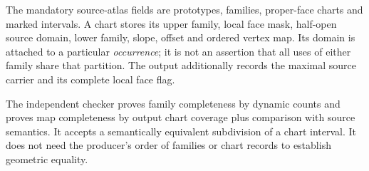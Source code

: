 \documentclass[11pt]{article}
\theoremstyle{definition}\newtheorem{definition}[theorem]{Definition}
\theoremstyle{remark}\newtheorem{remark}[theorem]{Remark}
\begin{document}
The mandatory source-atlas fields are prototypes, families, proper-face charts and marked intervals. A chart stores its upper family, local face mask, half-open source domain, lower family, slope, offset and ordered vertex map. Its domain is attached to a particular \emph{occurrence}; it is not an assertion that all uses of either family share that partition. The output additionally records the maximal source carrier and its complete local face flag.

The independent checker proves family completeness by dynamic counts and proves map completeness by output chart coverage plus comparison with source semantics. It accepts a semantically equivalent subdivision of a chart interval. It does not need the producer's order of families or chart records to establish geometric equality.
\end{document}
